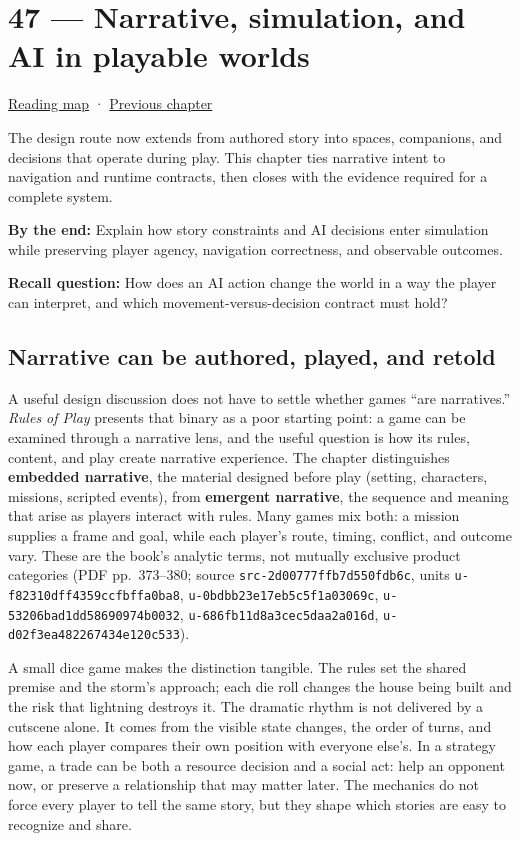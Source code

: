 \hypertarget{06-engine-ii-ch047}{}
\section{47 --- Narrative, simulation, and AI in playable worlds}\label{narrative-simulation-and-ai-in-playable-worlds}

\href{Chapter\%20Edition/03\%20-\%20Game\%20Engine/00\%20-\%20Reading\%20Map}{Reading map} · \hyperref[06-engine-ii-ch046]{Previous chapter}

The design route now extends from authored story into spaces, companions, and decisions that operate during play. This chapter ties narrative intent to navigation and runtime contracts, then closes with the evidence required for a complete system.

\textbf{By the end:} Explain how story constraints and AI decisions enter simulation while preserving player agency, navigation correctness, and observable outcomes.

\textbf{Recall question:} How does an AI action change the world in a way the player can interpret, and which movement-versus-decision contract must hold?

\subsection{Narrative can be authored, played, and retold}\label{narrative-can-be-authored-played-and-retold}

A useful design discussion does not have to settle whether games ``are narratives.'' \emph{Rules of Play} presents that binary as a poor starting point: a game can be examined through a narrative lens, and the useful question is how its rules, content, and play create narrative experience. The chapter distinguishes \textbf{embedded narrative}, the material designed before play (setting, characters, missions, scripted events), from \textbf{emergent narrative}, the sequence and meaning that arise as players interact with rules. Many games mix both: a mission supplies a frame and goal, while each player's route, timing, conflict, and outcome vary. These are the book's analytic terms, not mutually exclusive product categories (PDF pp.~373--380; source \texttt{src-2d00777ffb7d550fdb6c}, units \texttt{u-f82310dff4359ccfbffa0ba8}, \texttt{u-0bdbb23e17eb5c5f1a03069c}, \texttt{u-53206bad1dd58690974b0032}, \texttt{u-686fb11d8a3cec5daa2a016d}, \texttt{u-d02f3ea482267434e120c533}).

A small dice game makes the distinction tangible. The rules set the shared premise and the storm's approach; each die roll changes the house being built and the risk that lightning destroys it. The dramatic rhythm is not delivered by a cutscene alone. It comes from the visible state changes, the order of turns, and how each player compares their own position with everyone else's. In a strategy game, a trade can be both a resource decision and a social act: help an opponent now, or preserve a relationship that may matter later. The mechanics do not force every player to tell the same story, but they shape which stories are easy to recognize and share.

